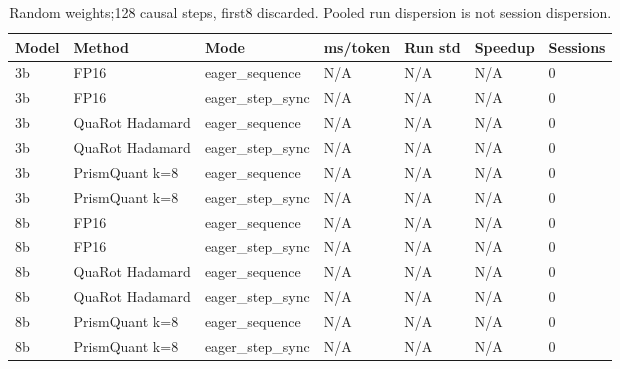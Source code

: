 \begin{table}[t]
\centering
\small
\caption{Random weights;128 causal steps, first8 discarded. Pooled run dispersion is not session dispersion.}
\begin{tabular}{lllllll}
\toprule
Model & Method & Mode & ms/token & Run std & Speedup & Sessions \\
\midrule
3b & FP16 & eager\_sequence & N/A & N/A & N/A & 0 \\
3b & FP16 & eager\_step\_sync & N/A & N/A & N/A & 0 \\
3b & QuaRot Hadamard & eager\_sequence & N/A & N/A & N/A & 0 \\
3b & QuaRot Hadamard & eager\_step\_sync & N/A & N/A & N/A & 0 \\
3b & PrismQuant k=8 & eager\_sequence & N/A & N/A & N/A & 0 \\
3b & PrismQuant k=8 & eager\_step\_sync & N/A & N/A & N/A & 0 \\
8b & FP16 & eager\_sequence & N/A & N/A & N/A & 0 \\
8b & FP16 & eager\_step\_sync & N/A & N/A & N/A & 0 \\
8b & QuaRot Hadamard & eager\_sequence & N/A & N/A & N/A & 0 \\
8b & QuaRot Hadamard & eager\_step\_sync & N/A & N/A & N/A & 0 \\
8b & PrismQuant k=8 & eager\_sequence & N/A & N/A & N/A & 0 \\
8b & PrismQuant k=8 & eager\_step\_sync & N/A & N/A & N/A & 0 \\
\bottomrule
\end{tabular}
\end{table}
